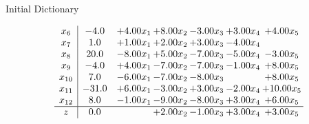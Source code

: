 \documentclass[8pt]{article}
\begin{document}
Initial Dictionary 

\[\begin{array}{c| c c@{\hskip 2pt} c@{\hskip 2pt} c@{\hskip 2pt} c@{\hskip 2pt} c@{\hskip 2pt} }
 x_{6}   &  -4.0 & +  4.00 x_{1} & +  8.00 x_{2} & -3.00 x_{3} & +  3.00 x_{4} & +  4.00 x_{5}\\
 x_{7}   &  1.0 & +  1.00 x_{1} & +  2.00 x_{2} & +  3.00 x_{3} & -4.00 x_{4} &   \\
 x_{8}   &  20.0 & -8.00 x_{1} & +  5.00 x_{2} & -7.00 x_{3} & -5.00 x_{4} & -3.00 x_{5}\\
 x_{9}   &  -4.0 & +  4.00 x_{1} & -7.00 x_{2} & -7.00 x_{3} & -1.00 x_{4} & +  8.00 x_{5}\\
 x_{10}   &  7.0 & -6.00 x_{1} & -7.00 x_{2} & -8.00 x_{3} &   & +  8.00 x_{5}\\
 x_{11}   &  -31.0 & +  6.00 x_{1} & -3.00 x_{2} & +  3.00 x_{3} & -2.00 x_{4} & + 10.00 x_{5}\\
 x_{12}   &  8.0 & -1.00 x_{1} & -9.00 x_{2} & -8.00 x_{3} & +  3.00 x_{4} & +  6.00 x_{5}\\
\hline
z    &  0.0  &   & +  2.00 x_{2} & -1.00 x_{3} & +  3.00 x_{4} & +  3.00 x_{5}\\
\end{array}\]
\end{document}
